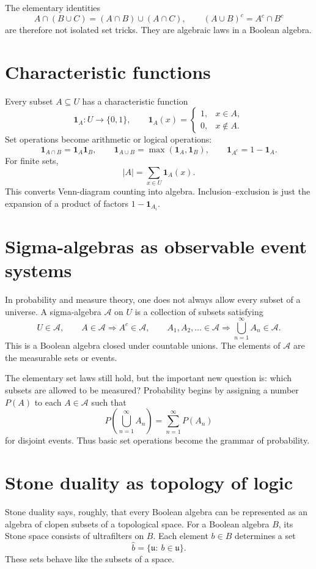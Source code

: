 The elementary identities
\[
  A\cap(B\cup C)=(A\cap B)\cup(A\cap C),\qquad
  (A\cup B)^c=A^c\cap B^c
\]
are therefore not isolated set tricks.  They are algebraic laws in a Boolean algebra.

\section{Characteristic functions}

Every subset $A\subseteq U$ has a characteristic function
\[
  \mathbf 1_A:U\to\{0,1\},\qquad
  \mathbf 1_A(x)=
  \begin{cases}
  1,&x\in A,\\
  0,&x\notin A.
  \end{cases}
\]
Set operations become arithmetic or logical operations:
\[
  \mathbf 1_{A\cap B}=\mathbf 1_A\mathbf 1_B,\qquad
  \mathbf 1_{A\cup B}=\max(\mathbf 1_A,\mathbf 1_B),\qquad
  \mathbf 1_{A^c}=1-\mathbf 1_A.
\]
For finite sets,
\[
  |A|=\sum_{x\in U}\mathbf 1_A(x).
\]
This converts Venn-diagram counting into algebra.  Inclusion--exclusion is just the expansion of a product of factors $1-\mathbf 1_{A_i}$.

\section{Sigma-algebras as observable event systems}

In probability and measure theory, one does not always allow every subset of a universe.  A sigma-algebra $\mathcal A$ on $U$ is a collection of subsets satisfying
\[
  U\in\mathcal A,\qquad A\in\mathcal A\Rightarrow A^c\in\mathcal A,\qquad
  A_1,A_2,\ldots\in\mathcal A\Rightarrow \bigcup_{n=1}^{\infty}A_n\in\mathcal A.
\]
This is a Boolean algebra closed under countable unions.  The elements of $\mathcal A$ are the measurable sets or events.

The elementary set laws still hold, but the important new question is: which subsets are allowed to be measured?  Probability begins by assigning a number $P(A)$ to each $A\in\mathcal A$ such that
\[
  P\left(\bigcup_{n=1}^{\infty}A_n\right)=\sum_{n=1}^{\infty}P(A_n)
\]
for disjoint events.  Thus basic set operations become the grammar of probability.

\section{Stone duality as topology of logic}

Stone duality says, roughly, that every Boolean algebra can be represented as an algebra of clopen subsets of a topological space.  For a Boolean algebra $B$, its Stone space consists of ultrafilters on $B$.  Each element $b\in B$ determines a set
\[
  \widehat b=\{\mathfrak u:\ b\in\mathfrak u\}.
\]
These sets behave like the subsets of a space.

